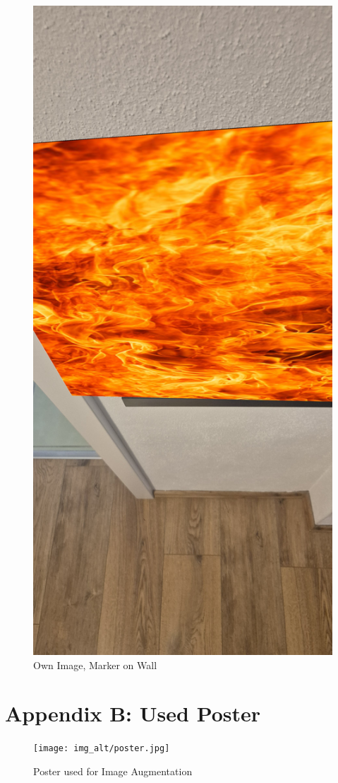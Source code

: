 \documentclass[a4paper,twocolumn]{article}
\begin{document}
\begin{figure}[htbp]
    \centering
    \includegraphics[width=\columnwidth, keepaspectratio]{newOutput/20241129_153147.jpg}
    \caption{Own Image, Marker on Wall \cite{tim-schweitzer}}
    \label{fig:example-pappendix3}
\end{figure}


\section*{Appendix B: Used Poster}

\begin{figure}[htbp]
    \centering
    \texttt{[image: img\_alt/poster.jpg]}
    \caption{Poster used for Image Augmentation\cite{v_speed}}
    \label{fig:img-poster}
\end{figure}
\end{document}
